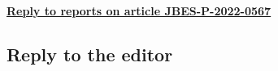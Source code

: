 \documentclass[a4paper,12pt]{article}
\begin{document}
\begin{center}
\underline{\Large\textbf{{Reply to reports on article JBES-P-2022-0567}}}\end{center}
\vspace{10pt}





\subsection*{Reply to the editor}
\end{document}
